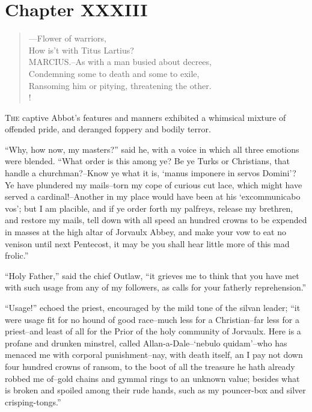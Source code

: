 \chapter{Chapter XXXIII}

\begin{verse}
---Flower of warriors,\\
How is't with Titus Lartius?\\
MARCIUS.--As with a man busied about decrees,\\
Condemning some to death and some to exile,\\
Ransoming him or pitying, threatening the other.\\!
\end{verse}

\lettrine{T}{he} captive Abbot's features and manners exhibited a
whimsical mixture
of offended pride, and deranged foppery and bodily terror.

``Why, how now, my masters?'' said he, with a voice in which all three
emotions were blended. ``What order is this among ye? Be ye Turks or
Christians, that handle a churchman?--Know ye what it is, `manus
imponere in servos Domini'? Ye have plundered my mails--torn my cope of
curious cut lace, which might have served a cardinal!--Another in my
place would have been at his `excommunicabo vos'; but I am placible, and
if ye order forth my palfreys, release my brethren, and restore my
mails, tell down with all speed an hundred crowns to be expended in
masses at the high altar of Jorvaulx Abbey, and make your vow to eat no
venison until next Pentecost, it may be you shall hear little more of
this mad frolic.''

``Holy Father,'' said the chief Outlaw, ``it grieves me to think that
you have met with such usage from any of my followers, as calls for your
fatherly reprehension.''

``Usage!'' echoed the priest, encouraged by the mild tone of the silvan
leader; ``it were usage fit for no hound of good race--much less for a
Christian--far less for a priest--and least of all for the Prior of the
holy community of Jorvaulx. Here is a profane and drunken minstrel,
called Allan-a-Dale--`nebulo quidam'--who has menaced me with corporal
punishment--nay, with death itself, an I pay not down four hundred
crowns of ransom, to the boot of all the treasure he hath already robbed
me of--gold chains and gymmal rings to an unknown value; besides what is
broken and spoiled among their rude hands, such as my pouncer-box and
silver crisping-tongs.''

